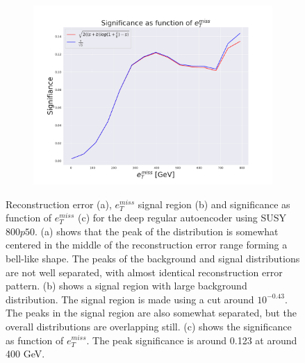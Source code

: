 \begin{figure}[H]
    \hfill  
    \begin{subfigure}{.40\textwidth}
        \includegraphics[width=\textwidth]{Figures/VAE_testing/small/2lep/significance_etmiss_800p0p050_-0.4271074800379211.pdf}
        \caption{}
        \label{fig:VAE_2lep_small_signi_800_3}
    \end{subfigure}
    \hfill      
    \caption[2lep shallow network | $800p50$ | VAE | 3]{Reconstruction error (a), $e_T^{miss}$ signal region (b) and significance as function of 
    $e_T^{miss}$ (c) for the deep regular autoencoder using SUSY $800p50$. 
    (a) shows that the peak of the distribution is somewhat centered in the middle 
    of the reconstruction error range forming a bell-like shape. The peaks of the background and signal 
    distributions are not well separated, with almost identical reconstruction error pattern. (b) 
    shows a signal region with large background distribution. The signal region is made using a cut around
    $10^{-0.43}$. The peaks in the signal region are also somewhat 
    separated, but the overall distributions are overlapping still. 
    (c) shows the significance as function of $e_T^{miss}$. 
    The peak significance is around 0.123 at around 400 GeV.}
    \label{fig:VAE_2lep_small_rec_sig_signi_800_3}
\end{figure}


